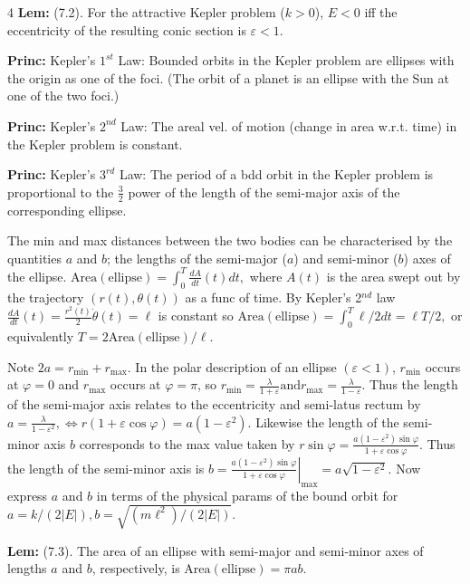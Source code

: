\documentclass[landscape, 8pt]{extarticle}
\begin{document}
\begin{multicols*}{4}
		\textbf{Lem:} (7.2). For the attractive Kepler problem ($k>0$), $E<0$ iff the eccentricity of the resulting conic section is $\varepsilon<1$.
		
		\textbf{Princ:} Kepler's $1^{st}$ Law: Bounded orbits in the Kepler problem are ellipses with the origin as one of the foci. (The orbit of a planet is an ellipse with the Sun at one of the two foci.)
		
		\textbf{Princ:} Kepler's $2^{nd}$ Law: The areal vel. of motion (change in area w.r.t. time) in the Kepler problem is constant.
		
		\textbf{Princ:} Kepler's $3^{rd}$ Law: The period of a bdd orbit in the Kepler problem is proportional to the $\frac{3}{2}$ power of the length of the semi-major axis of the corresponding ellipse.
		
		The min and max distances between the two bodies can be characterised by the quantities $a$ and $b$; the lengths of the semi-major ($a$) and semi-minor ($b$) axes of the ellipse.
		$
		\mathrm{Area(ellipse)}=\int_0^T\frac{dA}{dt}(t)dt,
		$
		where $A(t)$ is the area swept out by the trajectory $(r(t),\theta(t))$ as a func of time. By Kepler's 2$^{nd}$ law
		$
		\frac{dA}{dt}(t) = \frac{r^2(t)}{2}\dot\theta(t) = \ell
		$
		is constant so
		$
		\mathrm{Area(ellipse)}=\int_0^T\ell/2dt=\ell T/2,
		$
		or equivalently $T=2\mathrm{Area(ellipse)}/\ell$.
		
		Note $2a=r_{\min}+r_{\max}$. In the polar description of an ellipse $(\varepsilon<1)$, $r_{\min}$ occurs at $\varphi=0$ and $r_{\max}$ occurs at $\varphi=\pi$, so 
		$
		r_{\min}=\frac{\lambda}{1+\varepsilon}\text{and} r_{\max}=\frac{\lambda}{1-\varepsilon}.
		$
		Thus the length of the semi-major axis relates to the eccentricity and semi-latus rectum by
		$
		a=\frac{\lambda}{1-\varepsilon^2},\Leftrightarrow r(1+\varepsilon\cos\varphi)=a(1-\varepsilon^2).
		$
		Likewise the length of the semi-minor axis $b$ corresponds to the max value taken by $r\sin\varphi = \frac{a(1-\varepsilon^2)\sin\varphi}{1+\varepsilon\cos\varphi}.
		$
		Thus the length of the semi-minor axis is
		$
		b=\left.\frac{a(1-\varepsilon^2)\sin\varphi}{1+\varepsilon\cos\varphi}\right|_{\max}=a\sqrt{1-\varepsilon^2}.
		$
		Now express $a$ and $b$ in terms of the physical params of the bound orbit for
		$
		a=k/(2\left|E\right|), b=\sqrt{(m\ell^2)/(2\left|E\right|)}.
		$
		
		
		\textbf{Lem:} (7.3). The area of an ellipse with semi-major and semi-minor axes of lengths $a$ and $b$, respectively, is $\mathrm{Area(ellipse)}=\pi ab$.
		

\end{multicols*}
\end{document}
